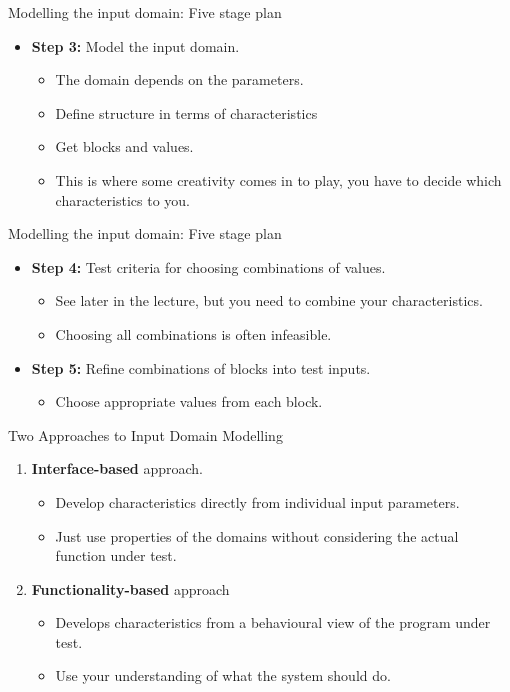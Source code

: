 \documentclass{beamer}
\begin{document}
\begin{frame}{Modelling the input domain: Five stage plan}
  \begin{itemize}
  \item {\bf Step 3:} Model the input domain.
    \begin{itemize}
    \item The domain depends on the parameters.
    \item Define structure in terms of characteristics
    \item Get blocks and values.
    \item This is where some creativity comes in to play, you have to
      decide which characteristics to you. 
    \end{itemize}
  \end{itemize}
\end{frame}
\begin{frame}{Modelling the input domain: Five stage plan}
  \begin{itemize}
  \item {\bf Step 4:} Test criteria for choosing combinations of values.
    \begin{itemize}
    \item See later in the lecture, but you need to combine your
      characteristics.
    \item Choosing all combinations is often infeasible.
    \end{itemize}
  \item {\bf Step 5:} Refine combinations of blocks into test inputs.
    \begin{itemize}
    \item Choose appropriate values from each block.
    \end{itemize}
  \end{itemize}
\end{frame}
\begin{frame}{Two Approaches to Input Domain Modelling}
  \begin{enumerate}
  \item {\bf Interface-based} approach.
    \begin{itemize}
    \item Develop characteristics directly from individual input
      parameters.
    \item Just use properties of the domains without considering the
      actual function under test.
    \end{itemize}
  \item {\bf Functionality-based} approach
    \begin{itemize}
    \item Develops characteristics from a behavioural view of the
      program under test.
    \item Use your understanding of what the system should do. 
    \end{itemize}
  \end{enumerate}
  
\end{frame}
\end{document}
